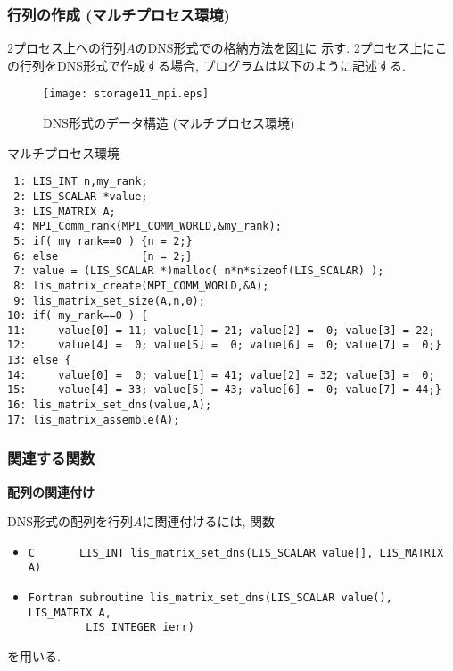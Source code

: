 \documentclass[a4paper]{jarticle}
\begin{document}
{{\newpage
\subsubsection{行列の作成 (マルチプロセス環境)}
2プロセス上への行列$A$のDNS形式での格納方法を図\ref{fig:storage11_mpi}に
示す. 
2プロセス上にこの行列をDNS形式で作成する場合, プログラムは以下のように記述する. 
\begin{figure}[h]
{\centering 
\texttt{[image: storage11\_mpi.eps]} 
\caption{DNS形式のデータ構造 (マルチプロセス環境)}\label{fig:storage11_mpi}}
\end{figure}
\begin{itembox}[l]{マルチプロセス環境}
\small
\begin{verbatim}
 1: LIS_INT n,my_rank;
 2: LIS_SCALAR *value;
 3: LIS_MATRIX A;
 4: MPI_Comm_rank(MPI_COMM_WORLD,&my_rank);
 5: if( my_rank==0 ) {n = 2;}
 6: else             {n = 2;}
 7: value = (LIS_SCALAR *)malloc( n*n*sizeof(LIS_SCALAR) );
 8: lis_matrix_create(MPI_COMM_WORLD,&A);
 9: lis_matrix_set_size(A,n,0);
10: if( my_rank==0 ) {
11:     value[0] = 11; value[1] = 21; value[2] =  0; value[3] = 22;
12:     value[4] =  0; value[5] =  0; value[6] =  0; value[7] =  0;}
13: else {
14:     value[0] =  0; value[1] = 41; value[2] = 32; value[3] =  0;
15:     value[4] = 33; value[5] = 43; value[6] =  0; value[7] = 44;}
16: lis_matrix_set_dns(value,A);
17: lis_matrix_assemble(A);
\end{verbatim}
\end{itembox}

\subsubsection{関連する関数}
\noindent
{\bf 配列の関連付け}

DNS形式の配列を行列$A$に関連付けるには, 関数
\begin{itemize}
\item \verb|C       LIS_INT lis_matrix_set_dns(LIS_SCALAR value[], LIS_MATRIX A)|
\item \verb|Fortran subroutine lis_matrix_set_dns(LIS_SCALAR value(), LIS_MATRIX A,|\\
      \verb|         LIS_INTEGER ierr)|
\end{itemize}
を用いる. 

\newpage
}}
\end{document}
